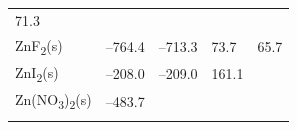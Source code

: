 \documentclass[
  9pt,
]{extbook}
\theoremstyle{definition}
\theoremstyle{definition}
\theoremstyle{definition}
\theoremstyle{remark}
\begin{document}
\begin{longtable}[]{@{}lllll@{}}
\begin{minipage}[t]{0.18\columnwidth}
71.3\strut
\end{minipage}\tabularnewline
\begin{minipage}[t]{0.10\columnwidth}\raggedright
ZnF\textsubscript{2}(s)\strut
\end{minipage} & \begin{minipage}[t]{0.19\columnwidth}\raggedright
--764.4\strut
\end{minipage} & \begin{minipage}[t]{0.20\columnwidth}\raggedright
--713.3\strut
\end{minipage} & \begin{minipage}[t]{0.18\columnwidth}\raggedright
73.7\strut
\end{minipage} & \begin{minipage}[t]{0.18\columnwidth}\raggedright
65.7\strut
\end{minipage}\tabularnewline
\begin{minipage}[t]{0.10\columnwidth}\raggedright
ZnI\textsubscript{2}(s)\strut
\end{minipage} & \begin{minipage}[t]{0.19\columnwidth}\raggedright
--208.0\strut
\end{minipage} & \begin{minipage}[t]{0.20\columnwidth}\raggedright
--209.0\strut
\end{minipage} & \begin{minipage}[t]{0.18\columnwidth}\raggedright
161.1\strut
\end{minipage} & \begin{minipage}[t]{0.18\columnwidth}\raggedright
\strut
\end{minipage}\tabularnewline
\begin{minipage}[t]{0.10\columnwidth}\raggedright
Zn(NO\textsubscript{3})\textsubscript{2}(s)\strut
\end{minipage} & \begin{minipage}[t]{0.19\columnwidth}\raggedright
--483.7\strut
\end{minipage} & \begin{minipage}[t]{0.20\columnwidth}\raggedright
\strut
\end{minipage} & \begin{minipage}[t]{0.18\columnwidth}\raggedright
\strut
\end{minipage} & \begin{minipage}[t]{0.18\columnwidth}\raggedright
\strut
\end{minipage}\tabularnewline
\begin{minipage}[t]{0.10\columnwidth}\raggedright

\end{minipage}
\end{longtable}
\end{document}
